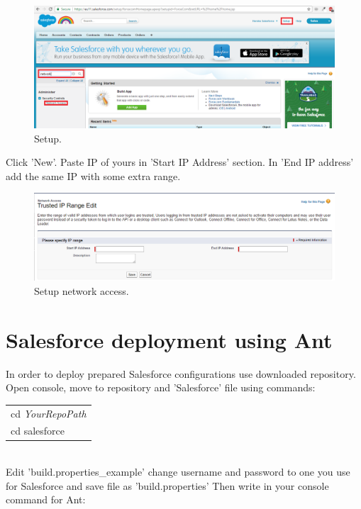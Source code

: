 \documentclass[12pt,a4paper]{article}
\begin{document}
\begin{figure}[H]
	\centering
	\includegraphics[width = 1 \textwidth]{images/network.PNG}
	\caption{Setup.}
	\label{fig:setup}
\end{figure}

Click 'New'. Paste IP of yours in 'Start IP Address' section. In 'End IP address' add the same IP with some extra range.

\begin{figure}[H]
	\centering
	\includegraphics[width = 1 \textwidth]{images/network2.PNG}
	\caption{Setup network access.}
	\label{fig:setupp}
\end{figure}

\section{Salesforce deployment using Ant}
In order to deploy prepared Salesforce configurations use downloaded repository. Open console, move to repository and 'Salesforce' file using commands:\\

\begin{tabular}{|l|}
	\hline
	cd \textit{YourRepoPath}\\
	cd salesforce\\
	\hline
\end{tabular}\\

Edit 'build.properties\_example' change username and password to one you use for Salesforce and save file as 'build.properties'
Then write in your console command for Ant:
\end{document}
